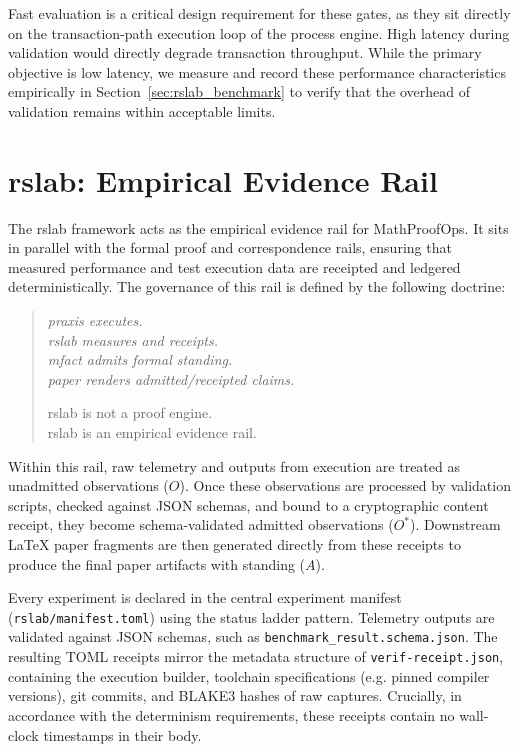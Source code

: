 \documentclass[11pt]{article}
\begin{document}
Fast evaluation is a critical design requirement for these gates, as they sit directly on the transaction-path execution loop of the process engine. High latency during validation would directly degrade transaction throughput. While the primary objective is low latency, we measure and record these performance characteristics empirically in Section~\ref{sec:rslab_benchmark} to verify that the overhead of validation remains within acceptable limits.

\section{rslab: Empirical Evidence Rail}
\label{sec:rslab}

The \textsf{rslab} framework acts as the empirical evidence rail for MathProofOps. It sits in parallel with the formal proof and correspondence rails, ensuring that measured performance and test execution data are receipted and ledgered deterministically. The governance of this rail is defined by the following doctrine:

\begin{quote}
\itshape
praxis executes. \\
rslab measures and receipts. \\
mfact admits formal standing. \\
paper renders admitted/receipted claims.

rslab is not a proof engine. \\
rslab is an empirical evidence rail.
\end{quote}

Within this rail, raw telemetry and outputs from execution are treated as unadmitted observations ($O$). Once these observations are processed by validation scripts, checked against JSON schemas, and bound to a cryptographic content receipt, they become schema-validated admitted observations ($O^*$). Downstream LaTeX paper fragments are then generated directly from these receipts to produce the final paper artifacts with standing ($A$).

Every experiment is declared in the central experiment manifest (\texttt{rslab/manifest.toml}) using the status ladder pattern. Telemetry outputs are validated against JSON schemas, such as \texttt{benchmark\_result.schema.json}. The resulting TOML receipts mirror the metadata structure of \texttt{verif-receipt.json}, containing the execution builder, toolchain specifications (e.g. pinned compiler versions), git commits, and BLAKE3 hashes of raw captures. Crucially, in accordance with the determinism requirements, these receipts contain no wall-clock timestamps in their body.
\end{document}
